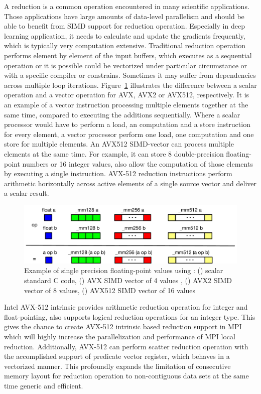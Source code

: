 \documentclass[sigconf]{acmart}
\newcommand{\mpi}[0]{\textsc{MPI}\xspace}
\begin{document}
A reduction is a common operation encountered in many scientific applications.
Those applications have large amounts of data-level parallelism and should be able
to benefit from SIMD support for reduction operation. Especially in deep learning application,
it needs to calculate and update the gradients frequently, which is typically very computation extensive.
Traditional reduction operation performs element by element of the input buffers,
which executes as a sequential operation or it is possible could be vectorized
under particular circumstance or with a specific compiler or constrains. Sometimes
it may suffer from dependencies across multiple loop iterations.
Figure~\ref{fig:sse_avx} illustrates the difference between a scalar operation and
a vector operation for AVX, AVX2 or AVX512, respectively.
%
It is an example of a vector instruction processing multiple elements together at the same time,
compared to executing the additions sequentially. Where a scalar processor would have to perform a load, an
computation and a store instruction for every element, a vector processor perform one load, one computation and
one store for multiple elements.
An AVX512 SIMD-vector can process multiple elements at
the same time. For example, it can store 8 double-precision floating-point numbers or 16 integer values, also allow the computation of those elements by executing a single instruction.
AVX-512 reduction instructions perform arithmetic horizontally across active elements of a
single source vector and deliver a scalar result.

\begin{figure}[h]
    \centering
    \includegraphics[width=\linewidth]{sse_avx.pdf}
    \caption{Example of single precision floating-point values using : (\colorbox{blue}{}) scalar standard C code, (\colorbox{green}{}) AVX SIMD vector of 4 values , (\colorbox{red}{}) AVX2 SIMD vector of 8 values, (\colorbox{yellow}{}) AVX512 SIMD vector of 16 values}
    \label{fig:sse_avx}
\end{figure}

Intel AVX-512 intrinsic provides arithmetic reduction operation for integer and
float-pointing, also supports logical reduction operations for an integer type.
This gives the chance to create AVX-512 intrinsic based reduction support in \mpi which
will highly increase the parallelization and performance of \mpi local reduction.
Additionally, AVX-512 can perform scatter reduction operation with the accomplished
support of predicate vector register, which behaves in a vectorized manner. This profoundly
expands the limitation of consecutive memory layout for reduction operation to non-contiguous
data sets at the same time generic and efficient.
\end{document}
